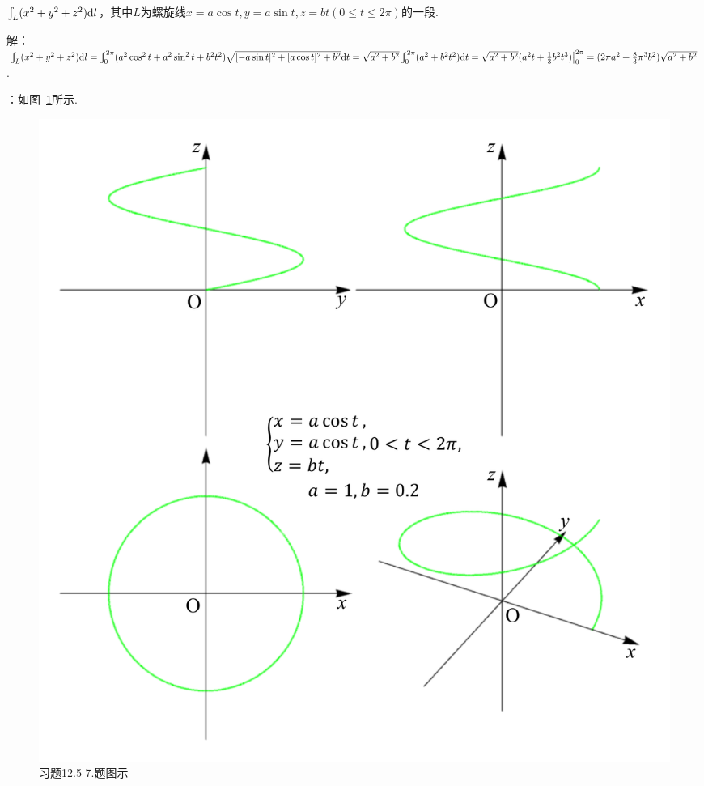 \documentclass[12pt,UTF8]{ctexart}
\newcommand{\Int}[4]{\varint\nolimits_{#1}^{#2}#3\mathrm d#4}
\newcommand{\LInt}[3]{\varint\nolimits_{#1}#2\mathrm d#3}
\begin{document}
\begin{enumerate}
$\LInt L{(x^2+y^2+z^2)}l$，其中$L$为螺旋线$x=a\cos t,y=a\sin t,z=bt(0\leqslant t\leqslant2\pi)$的一段.

解：$\LInt L{(x^2+y^2+z^2)}l=\Int0{2\pi}{(a^2\cos^2t+a^2\sin^2t+b^2t^2)\sqrt{[-a\sin t]^2+[a\cos t]^2+b^2}}t\\
=\sqrt{a^2+b^2}\Int0{2\pi}{(a^2+b^2t^2)}t=\sqrt{a^2+b^2}(a^2t+\frac13b^2t^3)\big|_0^{2\pi}=(2\pi a^2+\frac83\pi^3b^2)\sqrt{a^2+b^2}$.

{：}如图~\ref{12-5-7}所示.
\begin{figure}[H]
\begin{center}
\includegraphics[height=0.7\textheight]{Figures20/Fig12-5-7.pdf}
\end{center}
\caption{习题12.5 7.题图示}
\label{12-5-7}
\end{figure}
\end{enumerate}
\end{document}
